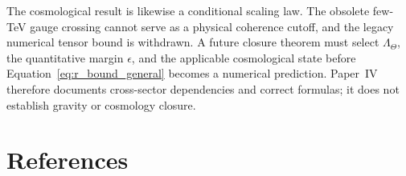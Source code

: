 \documentclass[11pt]{article}
\begin{document}
The cosmological result is likewise a conditional scaling law. The obsolete
few-TeV gauge crossing cannot serve as a physical coherence cutoff, and the
legacy numerical tensor bound is withdrawn. A future closure theorem must
select $\Lambda_\Theta$, the quantitative margin $\epsilon$, and the applicable
cosmological state before Equation~\eqref{eq:r_bound_general} becomes a
numerical prediction. Paper~IV therefore documents cross-sector dependencies
and correct formulas; it does not establish gravity or cosmology closure.


\section*{References}
\end{document}
